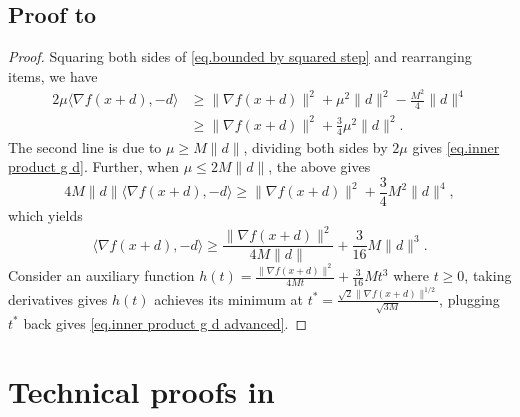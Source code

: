 \documentclass{article}
\begin{document}
\subsection*{Proof to~}
\begin{proof}
    Squaring both sides of \eqref{eq.bounded by squared step} and rearranging items, we have
    \begin{equation*}
        \begin{aligned}
            2\mu \langle \nabla f(x+d),-d \rangle & \geq \|\nabla f(x+d)\|^2 +\mu^2 \|d\|^2 -\frac{M^2}{4}\|d\|^4 \\
                                                  & \geq \|\nabla f(x+d)\|^2 +\frac{3}{4}\mu^2 \|d\|^2.
        \end{aligned}
    \end{equation*}
    The second line is due to $\mu\geq M\|d\|$, dividing both sides by $2\mu$ gives \eqref{eq.inner product g d}. Further, when $\mu \leq 2M\|d\|$, the above gives
    \begin{equation*}
        4M\|d\| \langle \nabla f(x+d),-d \rangle \geq \|\nabla f(x+d)\|^2 +\frac{3}{4} M^2 \|d\|^4,
    \end{equation*}
    which yields
    \begin{equation*}
        \langle \nabla f(x+d),-d \rangle \geq \frac{\|\nabla f(x+d)\|^2}{4M\|d\|}+\frac{3}{16}M\|d\|^3.
    \end{equation*}
    Consider an auxiliary function $h(t) = \frac{\|\nabla f(x+d)\|^2}{4Mt}+\frac{3}{16}Mt^3$ where $t\geq 0$, taking derivatives gives $h(t)$ achieves its minimum at $t^*= \frac{\sqrt{2}\|\nabla f(x+d)\|^{1/2}}{\sqrt{3M}}$, plugging $t^*$ back gives \eqref{eq.inner product g d advanced}.
\end{proof}
\section{Technical proofs in~}\label{sec.proof variant 1}
\end{document}
